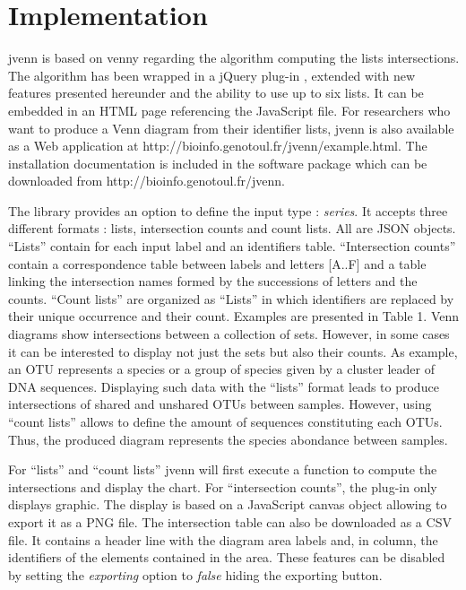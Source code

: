 \documentclass{bmcart}
\begin{document}
\section*{Implementation}

jvenn is based on venny regarding the algorithm computing the lists intersections.
The algorithm has been wrapped in a jQuery plug-in \cite{jquery}, extended with 
new features presented hereunder and the ability to use up to six lists. 
It can be embedded in an HTML page referencing the JavaScript file. For researchers
who want to produce a Venn diagram from their identifier lists, jvenn is also
available as a Web application at http://bioinfo.genotoul.fr/jvenn/example.html.
The installation documentation is included in the software package which can be
downloaded from http://bioinfo.genotoul.fr/jvenn.

The library provides an option to define the input type : \textit{series}. It
accepts three different formats : lists, intersection counts and count lists. 
All are JSON objects. ``Lists'' contain for each input label and an
identifiers table. ``Intersection counts'' contain a correspondence table 
between labels and letters [A..F] and a table linking the intersection names formed 
by the successions of letters and the counts. ``Count lists'' are organized as ``Lists'' 
in which identifiers are replaced by their unique occurrence and their count.
Examples are presented in Table 1. Venn diagrams show intersections between a
collection of sets. However, in some cases it can be interested to display not
just the sets but also their counts. As example, an OTU represents a species or
a group of species given by a cluster leader of DNA sequences. Displaying such
data with the ``lists'' format leads to produce intersections of shared and
unshared OTUs between samples. However, using ``count lists'' allows to define
the amount of sequences constituting each OTUs. Thus, the produced diagram
represents the species abondance between samples.

For ``lists'' and ``count lists'' jvenn will first execute a function to compute
the intersections and display the chart. For ``intersection counts'', the
plug-in  only displays graphic. The display is based on a JavaScript canvas
object  allowing to export it as a PNG file. The intersection table can also be
downloaded as a CSV file. It contains a header line with the diagram area labels
and, in column, the identifiers of the elements contained in the area. These
features  can be disabled by setting the \textit{exporting} option to
\textit{false} hiding the exporting button.
\end{document}
